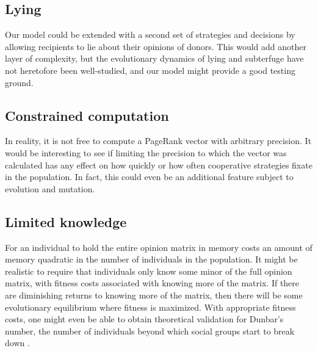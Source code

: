 \documentclass{amsart}
\begin{document}
\subsection{Lying}

Our model could be extended with a second set of strategies and
decisions by allowing recipients to lie about their opinions of
donors. This would add another layer of complexity, but the
evolutionary dynamics of lying and subterfuge have not heretofore been
well-studied, and our model might provide a good testing ground.

\subsection{Constrained computation}

In reality, it is not free to compute a PageRank vector with arbitrary
precision. It would be interesting to see if limiting the precision to
which the vector was calculated has any effect on how quickly or how
often cooperative strategies fixate in the population. In fact, this
could even be an additional feature subject to evolution and mutation.

\subsection{Limited knowledge}

For an individual to hold the entire opinion matrix in memory costs an
amount of memory quadratic in the number of individuals in the
population. It might be realistic to require that individuals only
know some minor of the full opinion matrix, with fitness costs
associated with knowing more of the matrix. If there are diminishing
returns to knowing more of the matrix, then there will be some
evolutionary equilibrium where fitness is maximized. With appropriate
fitness costs, one might even be able to obtain theoretical validation
for Dunbar's number, the number of individuals beyond which social
groups start to break down \cite{dunbar_neocortex_1995}.

 
\end{document}
